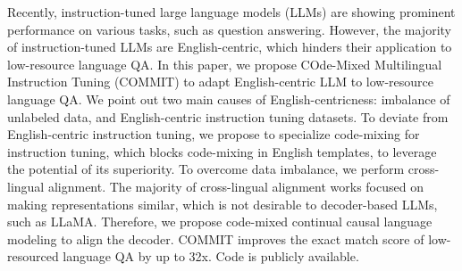 Recently, instruction-tuned large language models (LLMs) are showing prominent performance on various tasks, such as question answering. However, the majority of instruction-tuned LLMs are English-centric, which hinders their application to low-resource language QA. In this paper, we propose COde-Mixed Multilingual Instruction Tuning (COMMIT) to adapt English-centric LLM to low-resource language QA. We point out two main causes of English-centricness: imbalance of unlabeled data, and English-centric instruction tuning datasets. To deviate from English-centric instruction tuning, we propose to specialize code-mixing for instruction tuning, which blocks code-mixing in English templates, to leverage the potential of its superiority. To overcome data imbalance, we perform cross-lingual alignment. The majority of cross-lingual alignment works focused on making representations similar, which is not desirable to decoder-based LLMs, such as LLaMA.  Therefore, we propose code-mixed continual causal language modeling to align the decoder. COMMIT improves the exact match score of low-resourced language QA by up to 32x. Code is publicly available.